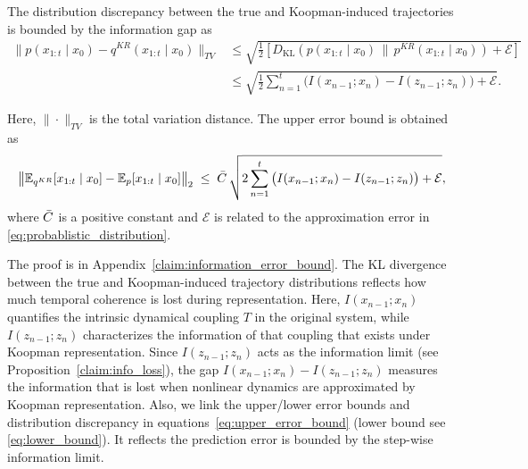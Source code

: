 \documentclass{article} %
\begin{document}
\begin{claimwithframe} 
\label{KL_1}
The distribution discrepancy between the true and Koopman-induced trajectories is bounded by the information gap as 
{\small
\begin{equation} \label{eq:upper_info}
\begin{aligned}
  \| p(x_{1:t} \mid x_0) - q^{KR}(x_{1:t} \mid x_0) \|_{TV} 
  &\leq \sqrt{\tfrac{1}{2}\!\left[ D_{\mathrm{KL}}\!\left( p(x_{1:t}\mid x_0) \,\|\, p^{KR}(x_{1:t}\mid x_0) \right) + \mathcal{E}\right]} \\
  &\leq \sqrt{\tfrac{1}{2} \sum_{n=1}^{t}\!\big( I(x_{n-1};x_{n}) - I(z_{n-1};z_{n})\big) + \mathcal{E} } .
\end{aligned}
\end{equation}
}

Here, $\| \cdot \|_{TV}$ is the total variation distance. The upper error bound is obtained as 
{\small
\begin{equation} \label{eq:upper_error_bound}
   \big\| \mathbb{E}_{q^{KR}}[x_{1:t} \mid x_0] - \mathbb{E}_p[x_{1:t} \mid x_0] \big\|_2
   \;\leq\; \Bar{C}\, \sqrt{2 \sum_{n=1}^{t} \big( I(x_{n-1};x_{n}) - I(z_{n-1};z_{n})\big) + \mathcal{E}} ,
\end{equation}
}
where $\Bar{C}$ is a positive constant and $\mathcal{E}$ is related to the approximation error in \eqref{eq:probablistic_distribution}.
\end{claimwithframe}


\vspace{-0.5em}
The proof is in Appendix~\ref{claim:information_error_bound}. The KL divergence between the true and Koopman-induced trajectory distributions reflects how much temporal coherence is lost during representation. Here, $I(x_{n-1};x_{n})$ quantifies the intrinsic dynamical coupling $T$ in the original system, while $I(z_{n-1};z_{n})$ characterizes the information of that coupling that exists under Koopman representation. Since $I(z_{n-1};z_{n})$ acts as the information limit (see Proposition~\ref{claim:info_loss}), the gap $I(x_{n-1}; x_{n}) - I(z_{n-1}; z_{n})$ measures the information that is lost when nonlinear dynamics are approximated by Koopman representation. Also, we link the upper/lower error bounds and distribution discrepancy in equations~\ref{eq:upper_error_bound} (lower bound see \eqref{eq:lower_bound}).  It reflects the prediction error is bounded by the step-wise information limit. 
\end{document}
